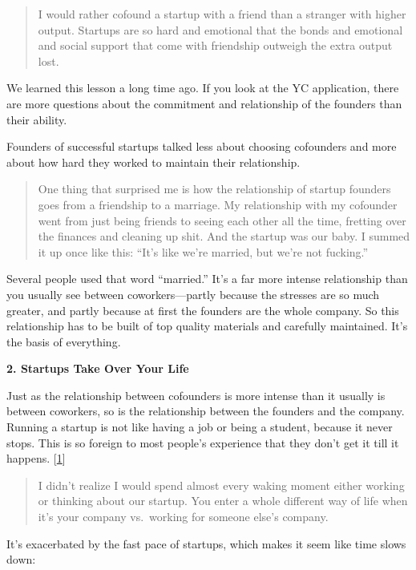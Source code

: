 \begin{quote}
I would rather cofound a startup with a friend than a stranger with
higher output. Startups are so hard and emotional that the bonds and
emotional and social support that come with friendship outweigh the
extra output lost.
\end{quote}

We learned this lesson a long time ago. If you look at the YC
application, there are more questions about the commitment and
relationship of the founders than their ability.

Founders of successful startups talked less about choosing cofounders
and more about how hard they worked to maintain their relationship.

\begin{quote}
One thing that surprised me is how the relationship of startup founders
goes from a friendship to a marriage. My relationship with my cofounder
went from just being friends to seeing each other all the time, fretting
over the finances and cleaning up shit. And the startup was our baby. I
summed it up once like this: ``It's like we're married, but we're not
fucking.''
\end{quote}

Several people used that word ``married.'' It's a far more intense
relationship than you usually see between coworkers---partly because the
stresses are so much greater, and partly because at first the founders
are the whole company. So this relationship has to be built of top
quality materials and carefully maintained. It's the basis of
everything.

\textbf{2. Startups Take Over Your Life}

Just as the relationship between cofounders is more intense than it
usually is between coworkers, so is the relationship between the
founders and the company. Running a startup is not like having a job or
being a student, because it never stops. This is so foreign to most
people's experience that they don't get it till it happens.
{[}\hyperref[f1n]{1}{]}

\begin{quote}
I didn't realize I would spend almost every waking moment either working
or thinking about our startup. You enter a whole different way of life
when it's your company vs.~working for someone else's company.
\end{quote}

It's exacerbated by the fast pace of startups, which makes it seem like
time slows down:

